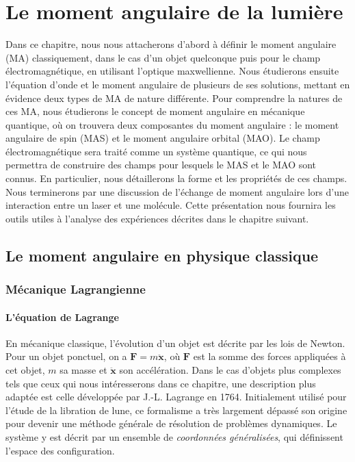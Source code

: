 \chapter{Le moment angulaire de la lumière}
\label{CH:LightAM}

Dans ce chapitre, nous nous attacherons d'abord à définir le moment angulaire (MA) classiquement, dans le cas d'un objet quelconque puis pour le champ électromagnétique, en utilisant l'optique maxwellienne. Nous étudierons ensuite l'équation d'onde et le moment angulaire de plusieurs de ses solutions, mettant en évidence deux types de MA de nature différente. Pour comprendre la natures de ces MA, nous étudierons le concept de moment angulaire en mécanique quantique, où on trouvera deux composantes du moment angulaire : le moment angulaire de spin (MAS) et le moment angulaire orbital (MAO). Le champ électromagnétique sera traité comme un système quantique, ce qui nous permettra de construire des champs pour lesquels le MAS et le MAO sont connus. En particulier, nous détaillerons la forme et les propriétés de ces champs. Nous terminerons par une discussion de l'échange de moment angulaire lors d'une interaction entre un laser et une molécule. Cette présentation nous fournira les outils utiles à l'analyse des expériences décrites dans le chapitre suivant.
\newpage
\section{Le moment angulaire en physique classique}
\subsection{Mécanique Lagrangienne}
\subsubsection{L'\'{e}quation de Lagrange}
\label{sec:lagrange}
En mécanique classique, l'évolution d'un objet est décrite par les lois de Newton. Pour un objet ponctuel, on a $\bm{F}=m\bm{\ddot{x}}$, où $\bm{F}$ est la somme des forces appliquées à cet objet, $m$ sa masse et $\bm{\ddot{x}}$ son accélération. Dans le cas d'objets plus complexes tels que ceux qui nous intéresserons dans ce chapitre, une description plus adaptée est celle développée par J.-L. Lagrange en 1764. Initialement utilisé pour l'étude de la libration de lune, ce formalisme a très largement dépassé son origine pour devenir une méthode générale de résolution de problèmes dynamiques. Le système y est décrit par un ensemble de \textit{coordonnées généralisées}, qui définissent l'espace des configuration. 

